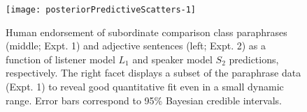 \documentclass[letterpaper, 12pt]{article}
\begin{document}
\begin{figure}[t]
  \begin{center}
    \texttt{[image: posteriorPredictiveScatters-1]}
  \end{center}
  \vspace{-0.55cm}
  \caption{\small Human endorsement of subordinate comparison class paraphrases (middle; Expt. 1) and adjective sentences (left; Expt. 2) as a function of listener model $L_1$ and speaker model $S_2$ predictions, respectively. The right facet displays a subset of the paraphrase data (Expt. 1) to reveal good quantitative fit even in a small dynamic range. Error bars correspond to 95\% Bayesian credible intervals.}
  \label{fig:results}
\end{figure}





\end{document}
